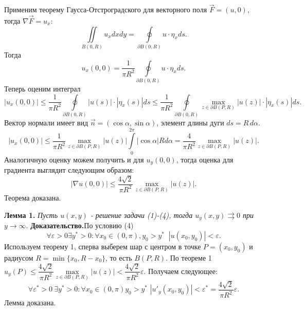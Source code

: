 \documentclass[12pt, a4paper]{article}
\begin{document}
	Применим теорему Гаусса-Отстроградского для векторного поля $\vec{F} = (u, 0)$, тогда $\nabla\vec{F} = u_x$:
	\begin{equation*}
		\iint\limits_{B(0,R)} u_x dx dy = \oint\limits_{\partial B(0,R)} u \cdot \eta_x ds.
	\end{equation*}
	Тогда 
	\begin{equation*}
		u_x(0,0) = \dfrac{1}{\pi R^2} \oint\limits_{\partial B(0,R)} u \cdot \eta_x ds.
	\end{equation*}
	Теперь оценим интеграл
	\begin{equation*}
		|u_x(0,0)| \leq \dfrac{1}{\pi R^2} \oint\limits_{\partial B(0,R)} |u(s)| \cdot |\eta_x(s)| ds \leq \dfrac{1}{\pi R^2} \oint\limits_{\partial B(0,R)}  \max\limits_{z \in \partial B(P,R)} |u(z)| \cdot |\eta_x(s)| ds.
	\end{equation*}
	Вектор нормали имеет вид $\vec{n} = (\cos\alpha, \sin\alpha)$, элемент длины дуги $ds = R\,d\alpha$.
	\begin{equation*}
		|u_x(0,0)| \leq \dfrac{1}{\pi R^2}  \max\limits_{z \in \partial B(P,R)} |u(z)|\int\limits_{0}^{2\pi}  |\cos \alpha| R d\alpha = \dfrac{4}{\pi R^2}  \max\limits_{z \in \partial B(P,R)} |u(z)|.
	\end{equation*}
	Аналогичную оценку можем получить и для $u_y(0,0)$, тогда оценка для градиента выглядит следующим образом:
	\begin{equation*}
		|\nabla u(0,0)| \leq \dfrac{4\sqrt2}{\pi R^2}  \max\limits_{z \in \partial B(P,R)} |u(z)|.
	\end{equation*}
	Теорема доказана.
	
	\textbf{Лемма 1.} \textit{Пусть $u(x,y)$ - решение задачи (1)-(4), тогда $u_y(x,y) \rightrightarrows 0$ при $ y \to \infty$}.
	\textbf{Доказательство.}По условию (4)
	\begin{equation*}
		\forall \varepsilon > 0 \exists y^* > 0 \colon \forall x_0 \in (0,\pi), y_0 > y^* \ \, \, |u(x_0,y_0)| < \varepsilon.
	\end{equation*}
	Используем теорему 1, сперва выберем шар с центром в точке $P = (x_0, y_0)$ и радиусом $R = \min\{x_0, R - x_0\}$, то есть $B(P, R)$. По теореме 1 $u_y(P) \leq  \dfrac{4\sqrt2}{\pi R^2}  \max\limits_{z \in \partial B(P,R)} |u(z)| <  \dfrac{4\sqrt2}{\pi R^2} \varepsilon$. Получаем следующее:
	\begin{equation*}
		\forall \varepsilon^* > 0 \ \exists y^* > 0 \colon \forall x_0 \in (0,\pi) y_0 > y^* \,\, |u'_y(x_0,y_0)| < \varepsilon^* = \dfrac{4\sqrt2}{\pi R^2} \varepsilon.
	\end{equation*}
	Лемма доказана.
	
\end{document}
